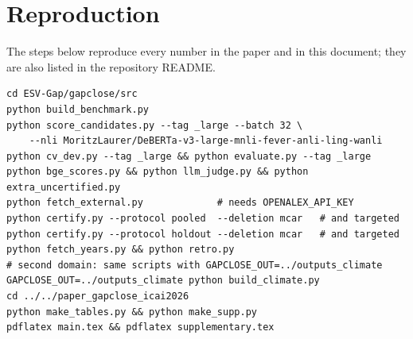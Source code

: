 \documentclass[10pt,a4paper]{article}
\theoremstyle{definition}
\theoremstyle{remark}
\begin{document}
\begin{table}[h]
\centering
\footnotesize
\caption{Gap dossiers at the 2010 cutoff (ESV-Scope +OA, in-situ calibration). Lag in years from the cutoff.}
\label{tab:dossier}

\end{table}

\section{Reproduction}
The steps below reproduce every number in the paper and in this document; they are also listed in the repository README.
\begin{verbatim}
cd ESV-Gap/gapclose/src
python build_benchmark.py
python score_candidates.py --tag _large --batch 32 \
    --nli MoritzLaurer/DeBERTa-v3-large-mnli-fever-anli-ling-wanli
python cv_dev.py --tag _large && python evaluate.py --tag _large
python bge_scores.py && python llm_judge.py && python extra_uncertified.py
python fetch_external.py             # needs OPENALEX_API_KEY
python certify.py --protocol pooled  --deletion mcar   # and targeted
python certify.py --protocol holdout --deletion mcar   # and targeted
python fetch_years.py && python retro.py
# second domain: same scripts with GAPCLOSE_OUT=../outputs_climate
GAPCLOSE_OUT=../outputs_climate python build_climate.py
cd ../../paper_gapclose_icai2026
python make_tables.py && python make_supp.py
pdflatex main.tex && pdflatex supplementary.tex
\end{verbatim}
\end{document}
